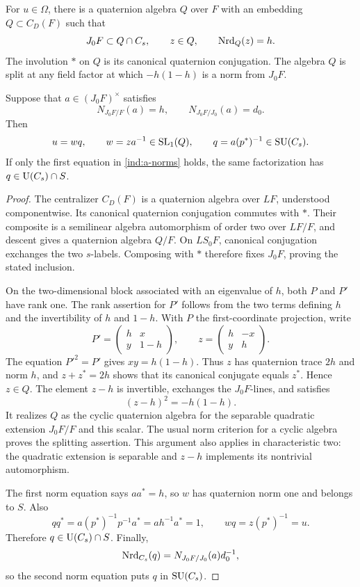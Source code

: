 \begin{lemma}\label{ind:even-factorization}
For $u\in\Omega$, there is a quaternion algebra $Q$ over $F$ with an
embedding $Q\subset C_D(F)$ such that
\[
 J_0F\subset Q\cap C_s,\qquad z\in Q,\qquad\operatorname{Nrd}_Q(z)=h.
\]
The involution $*$ on $Q$ is its canonical quaternion conjugation.
The algebra $Q$ is split at any field factor at which $-h(1-h)$ is a
norm from $J_0F$.

Suppose that $a\in(J_0F)^\times$ satisfies
\begin{equation}\label{ind:a-norms}
 N_{J_0F/F}(a)=h,\qquad N_{J_0F/J_0}(a)=d_0.
\end{equation}
Then
\begin{equation}\label{ind:two-factors}
 u=wq,\qquad w=za^{-1}\in\operatorname{SL}_1(Q),\qquad
 q=a(p^*)^{-1}\in\operatorname{SU}(C_s).
\end{equation}
If only the first equation in \eqref{ind:a-norms} holds, the same
factorization has $q\in\operatorname{U}(C_s)\cap S$.
\end{lemma}

\begin{proof}
The centralizer $C_D(F)$ is a quaternion algebra over $LF$, understood
componentwise.  Its canonical quaternion conjugation commutes with $*$.
Their composite is a semilinear algebra automorphism of order two over
$LF/F$, and descent gives a quaternion algebra $Q/F$.  On $LS_0F$,
canonical conjugation exchanges the two $s$-labels.  Composing with $*$
therefore fixes $J_0F$, proving the stated inclusion.

On the two-dimensional block associated with an eigenvalue of $h$,
both $P$ and $P'$ have rank one.  The rank assertion for $P'$ follows
from the two terms defining $h$ and the invertibility of $h$ and $1-h$.
With $P$ the first-coordinate projection, write
\[
 P'=\begin{pmatrix}h&x\\y&1-h\end{pmatrix},\qquad
 z=\begin{pmatrix}h&-x\\y&h\end{pmatrix}.
\]
The equation $P'^2=P'$ gives $xy=h(1-h)$.  Thus $z$ has quaternion
trace $2h$ and norm $h$, and $z+z^*=2h$ shows that its canonical
conjugate equals $z^*$.  Hence $z\in Q$.  The element $z-h$ is
invertible, exchanges the $J_0F$-lines, and satisfies
\[
                           (z-h)^2=-h(1-h).
\]
It realizes $Q$ as the cyclic quaternion algebra for the separable
quadratic extension $J_0F/F$ and this scalar.  The usual norm criterion
for a cyclic algebra proves the splitting assertion.  This argument
also applies in characteristic two: the quadratic extension is
separable and $z-h$ implements its nontrivial automorphism.

The first norm equation says $aa^*=h$, so $w$ has quaternion norm one
and belongs to $S$.  Also
\[
 q q^*=a(p^*)^{-1}p^{-1}a^*=a h^{-1}a^*=1,
 \qquad wq=z(p^*)^{-1}=u.
\]
Therefore $q\in\operatorname{U}(C_s)\cap S$.  Finally,
\[
 \operatorname{Nrd}_{C_s}(q)=N_{J_0F/J_0}(a)d_0^{-1},
\]
so the second norm equation puts $q$ in $\operatorname{SU}(C_s)$.
\end{proof}


